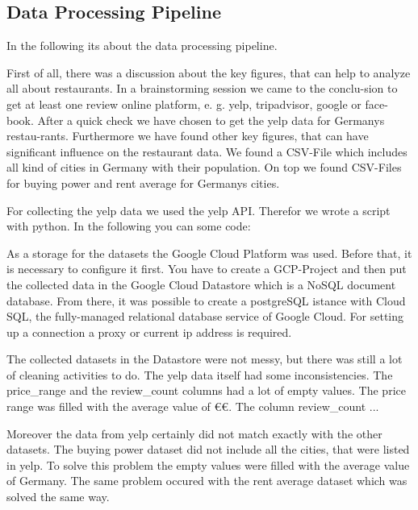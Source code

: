 \subsection{Data Processing Pipeline}
\label{subsec:pipeline}
In the following its about the data processing pipeline.

\label{subsec:Data sources}
First of all, there was a discussion about the key figures, that can help to analyze all about restaurants. In a brainstorming session we came to the conclu-sion to get at least one review online platform, e. g. yelp, tripadvisor, google or face-book. After a quick check we have chosen to get the yelp data for Germanys restau-rants.
Furthermore we have found other key figures, that can have significant influence on the restaurant data. We found a CSV-File which includes all kind of cities in Germany with their population. On top we found CSV-Files for buying power and rent average for Germanys cities.

\label{subsec:Data Ingestion}
For collecting the yelp data we used the yelp API. Therefor we wrote a script with python. In the following you can some code:

\label{subsec:Data Storage}
As a storage for the datasets the Google Cloud Platform was used. Before that, it is necessary to configure it first. You have to create a GCP-Project and then put the collected data in the Google Cloud Datastore which is a NoSQL document database. From there, it was possible to create a postgreSQL istance with Cloud SQL, the fully-managed relational database service of Google Cloud. For setting up a connection a proxy or current ip address is required.

\label{subsec:Data cleaning}
The collected datasets in the Datastore were not messy, but there was still a lot of cleaning activities to do. The yelp data itself had some inconsistencies. The price\_range and the review\_count columns had a lot of empty values. The price range was filled with the average value of \euro\euro. 
The column review\_count ...%

Moreover the data from yelp certainly did not match exactly with the other datasets. The buying power dataset did not include all the cities, that were listed in yelp. To solve this problem the empty values were filled with the average value of Germany. The same problem occured with the rent average dataset which was solved the same way.

\label{subsec:Data analysis}
